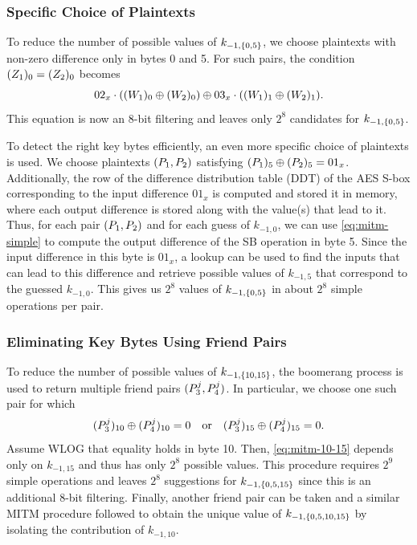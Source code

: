 \documentclass[twoside]{article}
\begin{document}
\subsubsection{Specific Choice of Plaintexts}

To reduce the number of possible values of \(k_{-1, \{0, 5\}}\), we choose
plaintexts with non-zero difference only in bytes 0 and 5. For such pairs, the
condition \((Z_1)_0 = (Z_2)_0\) becomes
\begin{equation}
    02_x \cdot ((W_1)_0 \oplus (W_2)_0) \oplus 03_x \cdot ((W_1)_1 \oplus (W_2)_1).
    \label{eq:mitm-simple}
\end{equation}
This equation is now an 8-bit filtering and leaves only \(2^8\) candidates for
\(k_{-1, \{0, 5\}}\).

To detect the right key bytes efficiently, an even more specific choice of
plaintexts is used. We choose plaintexts \((P_1, P_2)\) satisfying
\((P_1)_5 \oplus (P_2)_5 = 01_x\). Additionally, the row of the
difference distribution table (DDT) of the AES S-box corresponding to the input
difference \(01_x\) is computed and stored it in memory, where each output
difference is stored along with the value(s) that lead to it. Thus, for each
pair \((P_1, P_2)\) and for each guess of \(k_{-1, 0}\), we can use
\eqref{eq:mitm-simple} to compute the output difference of the SB operation in
byte 5. Since the input difference in this byte is \(01_x\), a lookup can be
used to find the inputs that can lead to this difference and retrieve possible
values of \(k_{-1, 5}\) that correspond to the guessed \(k_{-1, 0}\). This gives
us \(2^8\) values of \(k_{-1, \{0, 5\}}\) in about \(2^8\) simple operations
per pair.

\subsubsection{Eliminating Key Bytes Using Friend Pairs}

To reduce the number of possible values of \(k_{-1, \{10, 15\}}\), the
boomerang process is used to return multiple friend pairs \((P_3^j,
P_4^j)\). In particular, we choose one such pair for which
\begin{equation}
    (P_3^j)_{10} \oplus (P_4^j)_{10} = 0 \quad \textrm{or} \quad (P_3^j)_{15} \oplus (P_4^j)_{15} = 0.
    \label{eq:mitm-check}
\end{equation}
Assume WLOG that equality holds in byte 10. Then, \eqref{eq:mitm-10-15} depends
only on \(k_{-1, 15}\) and thus has only \(2^8\) possible values. This procedure
requires \(2^9\) simple operations and leaves \(2^8\) suggestions for \(k_{-1,
\{0, 5, 15\}}\) since this is an additional 8-bit filtering. Finally,
another friend pair can be taken and a similar MITM procedure followed to obtain
the unique value of \(k_{-1, \{0, 5, 10, 15\}}\) by isolating the
contribution of \(k_{-1, 10}\).
\end{document}
